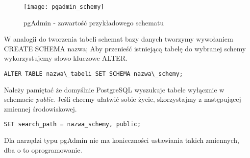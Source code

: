 \begin{figure}[!ht]
	\centering
	\texttt{[image: pgadmin\_schemy]}
	\caption{pgAdmin - zawartość przykładowego schematu}
\end{figure}
W analogii do tworzenia tabeli schemat bazy danych tworzymy wywołaniem \colorbox{code-gray}{CREATE SCHEMA nazwa;}
Aby przenieść istniejącą tabelę do wybranej schemy wykorzystujemy słowo kluczowe ALTER.
\begin{lstlisting}
ALTER TABLE nazwa\_tabeli SET SCHEMA nazwa\_schemy;
\end{lstlisting}

Należy pamiętać że domyślnie PostgreSQL wyszukuje tabele wyłącznie w schemacie \textit{public}. Jeśli chcemy ułatwić sobie życie, skorzystajmy z następującej zmiennej środowiskowej.
\begin{lstlisting}
SET search_path = nazwa_schemy, public;
\end{lstlisting}
Dla narzędzi typu pgAdmin nie ma konieczności ustawiania takich zmiennych, dba o to oprogramowanie.
